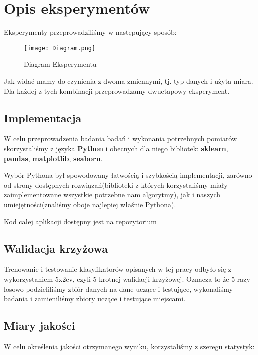 \section{Opis eksperymentów}

	Eksperymenty przeprowadziliśmy w następujący sposób:
	
	\begin{figure}[h]
		\centering
		\texttt{[image: Diagram.png]}
		\captionsetup{justification=centering}
		\caption{Diagram Eksperymentu}
		\label{fig:1}
	\end{figure}

	Jak widać mamy do czynienia z dwoma zmiennymi, tj. typ danych i użyta miara. Dla każdej z tych kombinacji przeprowadzamy dwuetapowy eksperyment.
	
	\subsection{Implementacja}
	
	W celu przeprowadzenia badania badań i wykonania potrzebnych pomiarów skorzystaliśmy z języka \textbf{Python} i obecnych dla niego bibliotek: \textbf{sklearn}, \textbf{pandas}, \textbf{matplotlib}, \textbf{seaborn}.
	
	Wybór Pythona był spowodowany łatwością i szybkością implementacji, zarówno od strony dostępnych rozwiązań(biblioteki z których korzystaliśmy miały zaimplementowane wszystkie potrzebne nam algorytmy), jak i naszych umiejętności(znaliśmy oboje najlepiej właśnie Pythona).
	
	Kod całej aplikacji dostępny jest na repozytorium \cite{2}
	
	\subsection{Walidacja krzyżowa}
	
	Trenowanie i testowanie klasyfikatorów opisanych w tej pracy odbyło się z wykorzystaniem 5x2cv, czyli 5-krotnej walidacji krzyżowej. Oznacza to że 5 razy losowo podzieliliśmy zbiór danych na dane uczące i testujące, wykonaliśmy badania i zamieniliśmy zbiory uczące i testujące miejscami.
	
	\subsection{Miary jakości}
	
	W celu określenia jakości otrzymanego wyniku, korzystaliśmy z szeregu statystyk:
	
